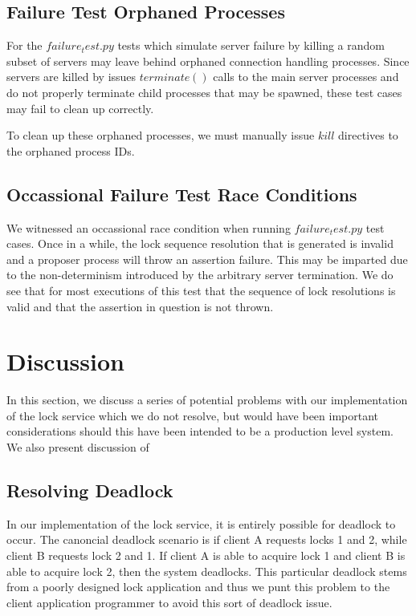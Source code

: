 \documentclass{article}
\begin{document}
\subsection{Failure Test Orphaned Processes}

For the $failure_test.py$ tests which simulate server failure by killing a random subset of servers may leave behind orphaned connection handling processes. 
Since servers are killed by issues $terminate()$ calls to the main server processes and do not properly terminate child processes that may be spawned, these test cases may fail to clean up correctly.

To clean up these orphaned processes, we must manually issue $kill$ directives to the orphaned process IDs.

\subsection{Occassional Failure Test Race Conditions}

We witnessed an occassional race condition when running $failure_test.py$ test cases.
Once in a while, the lock sequence resolution that is generated is invalid and a proposer process will throw an assertion failure.
This may be imparted due to the non-determinism introduced by the arbitrary server termination.
We do see that for most executions of this test that the sequence of lock resolutions is valid and that the assertion in question is not thrown.


\section{Discussion}

In this section, we discuss a series of potential problems with our implementation of the lock service which we do not resolve, but would have been important considerations should this have been intended to be a production level system.
We also present discussion of

\subsection{Resolving Deadlock}

In our implementation of the lock service, it is entirely possible for deadlock to occur.
The canoncial deadlock scenario is if client A requests locks 1 and 2, while client B requests lock 2 and 1.
If client A is able to acquire lock 1 and client B is able to acquire lock 2, then the system deadlocks.
This particular deadlock stems from a poorly designed lock application and thus we punt this problem to the client application programmer to avoid this sort of deadlock issue.
\end{document}
